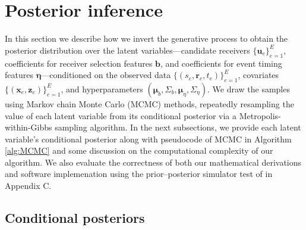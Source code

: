 \documentclass[ba]{imsart}
\numberwithin{equation}{section}
\theoremstyle{plain}
\begin{document}
		
	\section{Posterior inference}\label{sec:inference}
	In this section we describe how we invert the generative process to obtain the posterior distribution over the latent variables---candidate receivers $\{\boldsymbol{u}_e\}_{e=1}^E$, coefficients for receiver selection features $\boldsymbol{b}$, and coefficients for event timing features $\boldsymbol{\eta}$---conditioned on the observed data $\{(s_e, \boldsymbol{r}_e, t_e)\}_{e=1}^E$, covariates $\{(\boldsymbol{x}_e, \boldsymbol{z}_e)\}_{e=1}^E$, and hyperparameters $(\boldsymbol{\mu}_b, \Sigma_b, \boldsymbol{\mu}_\eta, \Sigma_\eta)$. We draw the samples using Markov chain Monte Carlo (MCMC) methods, repeatedly resampling the value of each latent variable from its conditional posterior via a Metropolis-within-Gibbs sampling algorithm. In the next subsections, we provide each latent variable's conditional posterior along with pseudocode of MCMC in Algorithm \ref{alg:MCMC} and some discussion on the computational complexity of our algorithm. We also evaluate the correctness of both our mathematical derivations and software implemenation using the prior--posterior simulator test of \cite{geweke2004getting} in Appendix C.
	
	\subsection{Conditional posteriors}\label{subsec:conditionaldist}
\end{document}
